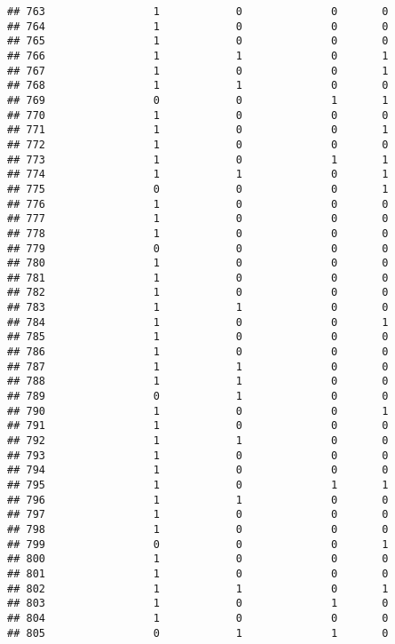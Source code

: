 \documentclass[]{article}
\begin{document}
\begin{verbatim}
## 763                 1            0              0       0
## 764                 1            0              0       0
## 765                 1            0              0       0
## 766                 1            1              0       1
## 767                 1            0              0       1
## 768                 1            1              0       0
## 769                 0            0              1       1
## 770                 1            0              0       0
## 771                 1            0              0       1
## 772                 1            0              0       0
## 773                 1            0              1       1
## 774                 1            1              0       1
## 775                 0            0              0       1
## 776                 1            0              0       0
## 777                 1            0              0       0
## 778                 1            0              0       0
## 779                 0            0              0       0
## 780                 1            0              0       0
## 781                 1            0              0       0
## 782                 1            0              0       0
## 783                 1            1              0       0
## 784                 1            0              0       1
## 785                 1            0              0       0
## 786                 1            0              0       0
## 787                 1            1              0       0
## 788                 1            1              0       0
## 789                 0            1              0       0
## 790                 1            0              0       1
## 791                 1            0              0       0
## 792                 1            1              0       0
## 793                 1            0              0       0
## 794                 1            0              0       0
## 795                 1            0              1       1
## 796                 1            1              0       0
## 797                 1            0              0       0
## 798                 1            0              0       0
## 799                 0            0              0       1
## 800                 1            0              0       0
## 801                 1            0              0       0
## 802                 1            1              0       1
## 803                 1            0              1       0
## 804                 1            0              0       0
## 805                 0            1              1       0

\end{verbatim}
\end{document}
